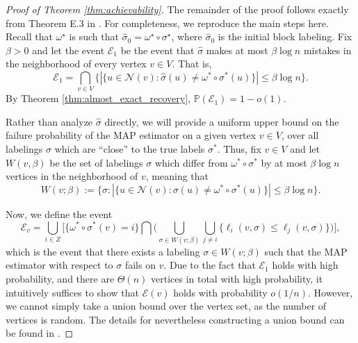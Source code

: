 \documentclass{article}
\renewcommand{\P}{\mathbb{P}}
\newcommand{\1}{\mathbbm{1}}
\newcommand{\calN}{\mathcal{N}}
\newcommand{\calE}{\mathcal{E}}
\theoremstyle{definition}
\theoremstyle{plain}
\begin{document}
\begin{proof}[Proof of Theorem \ref{thm:achievability}] The remainder of the proof follows exactly from Theorem E.3 in \cite{Gaudio+2025}. For completeness, we reproduce the main steps here. Recall that $\omega^{\star}$ is such that $\hat{\sigma}_0 = \omega^{\star} \circ \sigma^{\star}$, where $\hat{\sigma}_0$ is the initial block labeling.
Fix $\beta > 0$ and let the event $\calE_1$ be the event that $\hat{\sigma}$ makes at most $\beta \log n$ mistakes in the neighborhood of every vertex $v \in V$. That is,
\begin{equation*}
    \mathcal{E}_1 = \bigcap_{v \in V}\Big\{ |\{u \in \calN(v): \hat{\sigma}(u) \neq \omega^* \circ \sigma^*(u) \}| \leq \beta \log n \Big\}.
\end{equation*}
By Theorem \ref{thm:almost_exact_recovery}, $\P(\calE_1) = 1 - o(1)$.

Rather than analyze $\hat{\sigma}$ directly, we will provide a uniform upper bound on the failure probability of the MAP estimator on a given vertex $v \in V$, over all labelings $\sigma$ which are ``close'' to the true labels $\sigma^*$. Thus, fix $v \in V$ and let $W(v, \beta)$ be the set of labelings $\sigma$ which differ from $\omega^* \circ \sigma^*$ by at most $\beta \log n$ vertices in the neighborhood of $v$, meaning that
\begin{equation*}
    W(v; \beta) := \{\sigma: |\{u \in \calN(v): \sigma(u) \neq \omega^* \circ \sigma^*(u)\}| \leq \beta \log n\}.
\end{equation*}


Now, we define the event
\begin{equation*}
    \calE_v = \bigcup_{i \in Z} \bigg[ \{\omega^* \circ \sigma^*(v) = i\} \bigcap \bigg( \bigcup_{\sigma \in W(v; \beta)} \bigcup_{j \neq i} \{\ell_i(v, \sigma) \leq \ell_j(v, \sigma) \}\bigg)\bigg],
\end{equation*}
which is the event that there exists a labeling $\sigma \in W(v; \beta)$ such that the MAP estimator with respect to $\sigma$ fails on $v$. Due to the fact that $\mathcal{E}_1$ holds with high probability, and there are $\Theta(n)$ vertices in total with high probability, it intuitively suffices to show that $\mathcal{E}(v)$ holds with probability $o(1/n)$. However, we cannot simply take a union bound over the vertex set, as the number of vertices is random. The details for nevertheless constructing a union bound can be found in \cite{Gaudio+2025}.


\end{proof}
\end{document}
